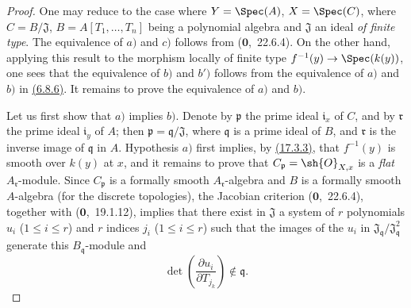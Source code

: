 \begin{proof}
One may reduce to the case where $Y=\Spec(A)$, $X=\Spec(C)$, where $C=B/\mathfrak{J}$, $B=A[T_1,\ldots,T_n]$ being a polynomial algebra and $\mathfrak{J}$ an ideal \emph{of finite type}.
The equivalence of $a)$ and $c)$ follows from ($\mathbf{0}$,~22.6.4).
On the other hand, applying this result to the morphism locally of finite type $f^{-1}(y)\to\Spec(k(y))$, one sees that the equivalence of $b)$ and $b')$ follows from the equivalence of $a)$ and $b)$ in {\hyperlink{ega4.c04.thm.6-8-6}{(6.8.6)}}.
It remains to prove the equivalence of $a)$ and $b)$.

Let us first show that $a)$ implies $b)$.
Denote by $\mathfrak{p}$ the prime ideal $\mathfrak{i}_x$ of $C$, and by $\mathfrak{r}$ the prime ideal $\mathfrak{i}_y$ of $A$; then $\mathfrak{p}=\mathfrak{q}/\mathfrak{J}$, where $\mathfrak{q}$ is a prime ideal of $B$, and $\mathfrak{r}$ is the inverse image of $\mathfrak{q}$ in $A$.
Hypothesis $a)$ first implies, by {\hyperlink{ega4.c04.prop.17-3-3}{(17.3.3)}}, that $f^{-1}(y)$ is smooth over $k(y)$ at $x$, and it remains to prove that $C_\mathfrak{p}=\sh{O}_{X,x}$ is a \emph{flat} $A_\mathfrak{r}$-module.
Since $C_\mathfrak{p}$ is a formally smooth $A_\mathfrak{r}$-algebra and $B$ is a formally smooth $A$-algebra (for the discrete topologies), the Jacobian criterion ($\mathbf{0}$,~22.6.4), together with ($\mathbf{0}$,~19.1.12), implies that there exist in $\mathfrak{J}$ a system of $r$ polynomials $u_i$ ($1\leqslant i\leqslant r$) and $r$ indices $j_i$ ($1\leqslant i\leqslant r$) such that the images of the $u_i$ in $\mathfrak{J}_\mathfrak{q}/\mathfrak{J}_\mathfrak{q}^2$ generate this $B_\mathfrak{q}$-module and
\[
\label{IV.17.5.1.1}
\tag{17.5.1.1}
\det\left(\frac{\partial u_i}{\partial T_{j_k}}\right)\notin\mathfrak{q}.
\]



\end{proof}
